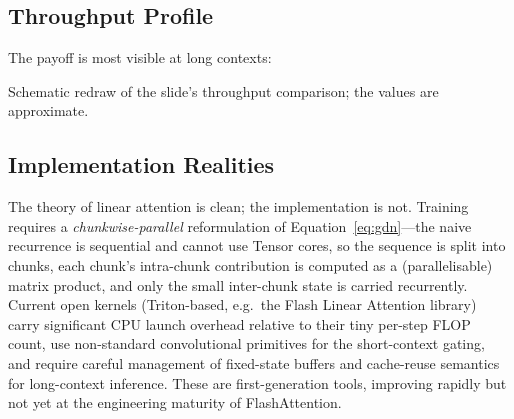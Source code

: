 \documentclass[11pt,a4paper]{article}
\theoremstyle{definition}
\theoremstyle{remark}
\theoremstyle{plain}
\begin{document}
\subsection{Throughput Profile}

The payoff is most visible at long contexts:

\begin{center}
\par\smallskip
{\small Schematic redraw of the slide's throughput comparison; the values
are approximate.}
\end{center}

\subsection{Implementation Realities}

The theory of linear attention is clean; the implementation is not.
Training requires a \emph{chunkwise-parallel} reformulation of
Equation~\eqref{eq:gdn}---the naive recurrence is sequential and cannot
use Tensor cores, so the sequence is split into chunks, each chunk's
intra-chunk contribution is computed as a (parallelisable) matrix product,
and only the small inter-chunk state is carried recurrently. Current open
kernels (Triton-based, e.g.\ the Flash Linear Attention library) carry
significant CPU launch overhead relative to their tiny per-step FLOP
count, use non-standard convolutional primitives for the short-context
gating, and require careful management of fixed-state buffers and
cache-reuse semantics for long-context inference. These are
first-generation tools, improving rapidly but not yet at the engineering
maturity of FlashAttention.
\end{document}
